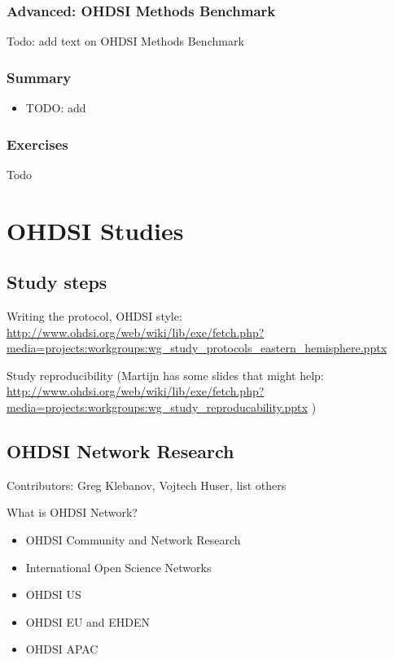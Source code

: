 \documentclass[11pt]{book}
\providecommand{\tightlist}{%
  \setlength{\itemsep}{0pt}\setlength{\parskip}{0pt}}
\let\BeginKnitrBlock\begin \let\EndKnitrBlock\end
\begin{document}
\section{Advanced: OHDSI Methods
Benchmark}\label{advanced-ohdsi-methods-benchmark}

Todo: add text on OHDSI Methods Benchmark

\section{Summary}\label{summary-4}

\BeginKnitrBlock{rmdsummary}
\begin{itemize}
\tightlist
\item
  TODO: add
\end{itemize}
\EndKnitrBlock{rmdsummary}

\section{Exercises}\label{exercises-2}

Todo

\part{OHDSI Studies}\label{part-ohdsi-studies}

\chapter{Study steps}\label{StudySteps}

Writing the protocol, OHDSI style:
\url{http://www.ohdsi.org/web/wiki/lib/exe/fetch.php?media=projects:workgroups:wg_study_protocols_eastern_hemisphere.pptx}

Study reproducibility (Martijn has some slides that might help:
\url{http://www.ohdsi.org/web/wiki/lib/exe/fetch.php?media=projects:workgroups:wg_study_reproducability.pptx}
)

\chapter{OHDSI Network Research}\label{NetworkResearch}

Contributors: Greg Klebanov, Vojtech Huser, list others

What is OHDSI Network?

\begin{itemize}
\tightlist
\item
  OHDSI Community and Network Research
\item
  International Open Science Networks
\item
  OHDSI US
\item
  OHDSI EU and EHDEN
\item
  OHDSI APAC
\end{itemize}
\end{document}
